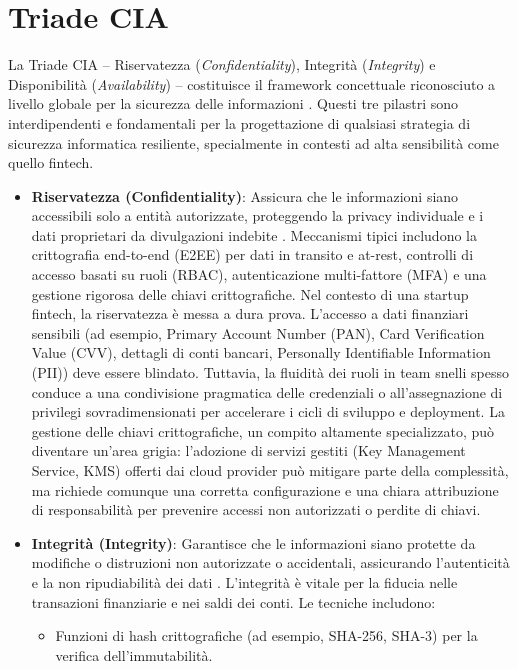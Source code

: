 \section{Triade CIA}
La Triade CIA – Riservatezza (\textit{Confidentiality}), Integrità (\textit{Integrity}) e Disponibilità (\textit{Availability}) – costituisce il framework concettuale riconosciuto a livello globale per la sicurezza delle informazioni \cite{NIST_SP_1800_26}. Questi tre pilastri sono interdipendenti e fondamentali per la progettazione di qualsiasi strategia di sicurezza informatica resiliente, specialmente in contesti ad alta sensibilità come quello fintech.
\begin{itemize}
\item \textbf{Riservatezza (Confidentiality)}: Assicura che le informazioni siano accessibili solo a entità autorizzate, proteggendo la privacy individuale e i dati proprietari da divulgazioni indebite \cite{NIST_SP_1800_26}. Meccanismi tipici includono la crittografia end-to-end (E2EE) per dati in transito e at-rest, controlli di accesso basati su ruoli (RBAC), autenticazione multi-fattore (MFA) e una gestione rigorosa delle chiavi crittografiche.
Nel contesto di una startup fintech, la riservatezza è messa a dura prova. L'accesso a dati finanziari sensibili (ad esempio, Primary Account Number (PAN), Card Verification Value (CVV), dettagli di conti bancari, Personally Identifiable Information (PII)) deve essere blindato. Tuttavia, la fluidità dei ruoli in team snelli spesso conduce a una condivisione pragmatica delle credenziali o all'assegnazione di privilegi sovradimensionati per accelerare i cicli di sviluppo e deployment. La gestione delle chiavi crittografiche, un compito altamente specializzato, può diventare un'area grigia: l'adozione di servizi gestiti (Key Management Service, KMS) offerti dai cloud provider può mitigare parte della complessità, ma richiede comunque una corretta configurazione e una chiara attribuzione di responsabilità per prevenire accessi non autorizzati o perdite di chiavi.
\item \textbf{Integrità (Integrity)}: Garantisce che le informazioni siano protette da modifiche o distruzioni non autorizzate o accidentali, assicurando l'autenticità e la non ripudiabilità dei dati \cite{NIST_SP_1800_26}. L'integrità è vitale per la fiducia nelle transazioni finanziarie e nei saldi dei conti. Le tecniche includono:
\begin{itemize}
\item Funzioni di hash crittografiche (ad esempio, SHA-256, SHA-3) per la verifica dell'immutabilità.

\end{itemize}
\end{itemize}
